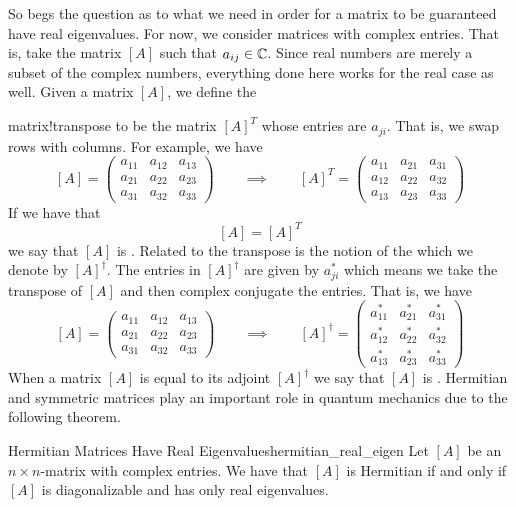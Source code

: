             So begs the question as to what we need in order for a matrix to be guaranteed have real eigenvalues.  For now, we consider matrices with complex entries.  That is, take the matrix $[A]$ such that $a_{ij}\in \mathbb{C}$. Since real numbers are merely a subset of the complex numbers, everything done here works for the real case as well.  Given a matrix $[A]$, we define the \item{matrix!transpose} to be the matrix $[A]^T$ whose entries are $a_{ji}$. That is, we swap rows with columns.  For example, we have
            \[
            [A] = \begin{pmatrix} a_{11} & a_{12} & a_{13} \\ a_{21} & a_{22} & a_{23} \\ a_{31} & a_{32} & a_{33} \end{pmatrix} \qquad \implies \qquad [A]^T = \begin{pmatrix} a_{11} & a_{21} & a_{31} \\ a_{12} & a_{22} & a_{32} \\ a_{13} & a_{23} & a_{33} \end{pmatrix} 
            \]
            If we have that
            \[
            [A]=[A]^T
            \]
            we say that $[A]$ is . Related to the transpose is the notion of the  which we denote by $[A]^\dagger$.  The entries in $[A]^\dagger$ are given by $a_{ji}^*$ which means we take the transpose of $[A]$ and then complex conjugate the entries. That is, we have
            \[
                [A] = \begin{pmatrix} a_{11} & a_{12} & a_{13} \\ a_{21} & a_{22} & a_{23} \\ a_{31} & a_{32} & a_{33} \end{pmatrix} \qquad \implies \qquad [A]^\dagger = \begin{pmatrix} a_{11}^* & a_{21}^* & a_{31}^* \\ a_{12}^* & a_{22}^* & a_{32}^* \\ a_{13}^* & a_{23}^* & a_{33}^* \end{pmatrix}
            \]
            When a matrix $[A]$ is equal to its adjoint $[A]^\dagger$ we say that $[A]$ is .  Hermitian and symmetric matrices play an important role in quantum mechanics due to the following theorem.  
            
            \begin{thm}{Hermitian Matrices Have Real Eigenvalues}{hermitian_real_eigen}
                Let $[A]$ be an $n\times n$-matrix with complex entries. We have that $[A]$ is Hermitian if and only if $[A]$ is diagonalizable and has only real eigenvalues.
            \end{thm}
            
